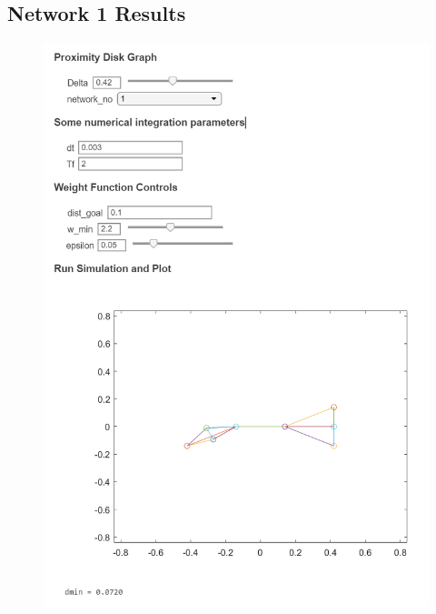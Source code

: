 \documentclass[]{article}
\numberwithin{equation}{section}
\begin{document}
\subsection{Network 1 Results}
\begin{figure}[h]
    \centering
    \includegraphics[height = 0.75 \textheight]{figs/pblm6_network1.png}
\end{figure}


\newpage
\end{document}
